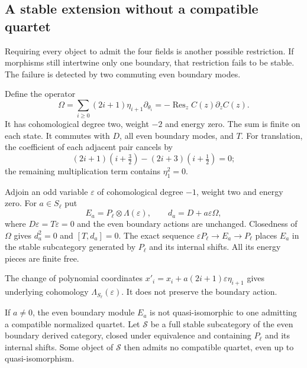 \subsection{A stable extension without a compatible quartet}

Requiring every object to admit the four fields is another
possible restriction. If morphisms still intertwine only
one boundary, that restriction fails to be stable. The
failure is detected by two commuting even boundary modes.

Define the operator
\[
 \Omega=\sum_{i\geq0}(2i+1)\eta_{i+1}\partial_{\theta_i}
            =-\operatorname{Res}_z C(z)\partial_zC(z).
\]
It has cohomological degree two, weight $-2$ and energy
zero. The sum is finite on each state. It commutes with
$D$, all even boundary modes, and $T$. For translation,
the coefficient of each adjacent pair cancels by
\[
 (2i+1)(i+\tfrac32)-(2i+3)(i+\tfrac12)=0;
\]
the remaining multiplication term contains $\eta_1^2=0$.

Adjoin an odd variable $\varepsilon$ of cohomological degree
$-1$, weight two and energy zero. For $a\in S_\ell$ put
\[
 E_a=P_\ell\otimes\Lambda(\varepsilon),\qquad
 d_a=D+a\varepsilon\Omega,
\]
where $D\varepsilon=T\varepsilon=0$ and the even boundary
actions are unchanged. Closedness of $\Omega$ gives
$d_a^2=0$ and $[T,d_a]=0$. The exact sequence
$\varepsilon P_\ell\to E_a\to P_\ell$ places $E_a$ in
the stable subcategory generated by $P_\ell$ and its
internal shifts. All its energy pieces are finite free.

The change of polynomial coordinates
$x'_i=x_i+a(2i+1)\varepsilon\eta_{i+1}$ gives underlying
cohomology $\Lambda_{S_\ell}(\varepsilon)$. It does not
preserve the boundary action.

\begin{proposition}\label{mht:prop:ramond-stable-cone}
If $a\ne0$, the even boundary module $E_a$ is not
quasi-isomorphic to one admitting a compatible normalized
quartet. Let $\mathcal S$ be a full stable subcategory
of the even boundary derived category, closed under
equivalence and containing $P_\ell$ and its internal shifts.
Some object of $\mathcal S$ then admits no compatible
quartet, even up to quasi-isomorphism.
\end{proposition}

